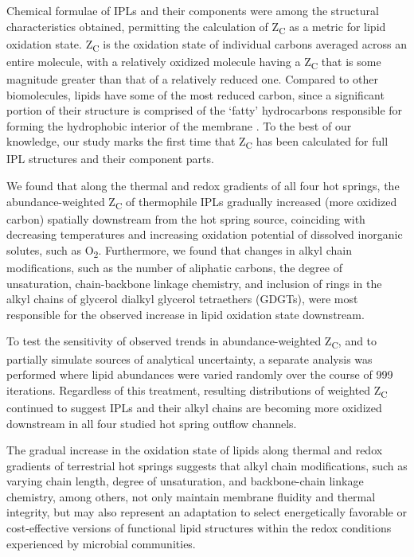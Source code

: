 Chemical formulae of IPLs and their components were among the structural characteristics obtained, permitting the calculation of Z\textsubscript{C} as a metric for lipid oxidation state. Z\textsubscript{C} is the oxidation state of individual carbons averaged across an entire molecule, with a relatively oxidized molecule having a Z\textsubscript{C} that is some magnitude greater than that of a relatively reduced one. Compared to other biomolecules, lipids have some of the most reduced carbon, since a significant portion of their structure is comprised of the `fatty' hydrocarbons responsible for forming the hydrophobic interior of the membrane \citep{likens2010biogeochemistry}. To the best of our knowledge, our study marks the first time that Z\textsubscript{C} has been calculated for full IPL structures and their component parts.


We found that along the thermal and redox gradients of all four hot springs, the abundance-weighted Z\textsubscript{C} of thermophile IPLs gradually increased (more oxidized carbon) spatially downstream from the hot spring source, coinciding with decreasing temperatures and increasing oxidation potential of dissolved inorganic solutes, such as O\textsubscript{2}. Furthermore, we found that changes in alkyl chain modifications, such as the number of aliphatic carbons, the degree of unsaturation, chain-backbone linkage chemistry, and inclusion of rings in the alkyl chains of glycerol dialkyl glycerol tetraethers (GDGTs), were most responsible for the observed increase in lipid oxidation state downstream.

To test the sensitivity of observed trends in abundance-weighted Z\textsubscript{C}, and to partially simulate sources of analytical uncertainty, a separate analysis was performed where lipid abundances were varied randomly over the course of 999 iterations. Regardless of this treatment, resulting distributions of weighted Z\textsubscript{C} continued to suggest IPLs and their alkyl chains are becoming more oxidized downstream in all four studied hot spring outflow channels.

The gradual increase in the oxidation state of lipids along thermal and redox gradients of terrestrial hot springs suggests that alkyl chain modifications, such as varying chain length, degree of unsaturation, and backbone-chain linkage chemistry, among others, not only maintain membrane fluidity and thermal integrity, but may also represent an adaptation to select energetically favorable or cost-effective versions of functional lipid structures within the redox conditions experienced by microbial communities.




